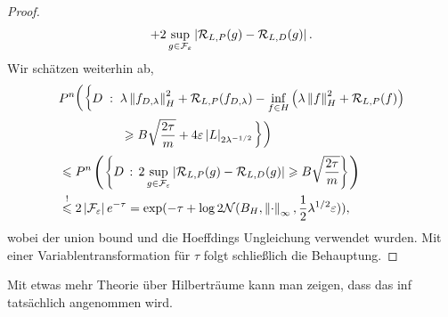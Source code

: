\begin{proof}
\begin{align*}
+ 2\sup_{g\in \mathcal{F}_\varepsilon} \left|\mathcal{R}_{L,P}(g)-\mathcal{R}_{L,D}(g)\right|.
\end{align*}
Wir schätzen weiterhin ab,
\begin{align*}
&P^n\bigg(\bigg\{D\; :\; \lambda\left\|f_{D,\lambda}\right\|^2_H +
\mathcal{R}_{L,P}(f_{D,\lambda}) - \inf_{f\in H} \left( \lambda\left\|f\right\|_H^2 +
\mathcal{R}_{L,P}(f) \right) \\
&\qquad \qquad \quad \geqslant B\sqrt{\frac{2\tau}{m}} + 4\varepsilon
\left|L\right|_{2\lambda^{-1/2}} \bigg\} \bigg)\\
&\leqslant
P^n\left(\left\{ D\,:\,2\sup_{g\in \mathcal{F}_\varepsilon}\left|\mathcal{R}_{L,P}(g) - \mathcal{R}_{L,D}(g)\right|\geqslant
B\sqrt{\frac{2\tau}{m}} \right\} \right)\\
&\overset{!}{\leqslant}
2\left|\mathcal{F}_\varepsilon\right|e^{-\tau}
= \exp(-\tau + \log 2\mathcal{N}(B_H,\left\|\cdot\right\|_\infty, \frac{1}{2}\lambda^{1/2}\varepsilon)
),
\end{align*}
wobei der union bound und die Hoeffdings Ungleichung verwendet wurden. Mit einer
Variablentransformation für $\tau$ folgt schließlich die Behauptung.\qedhere
\end{proof}

\begin{bem*}
Mit etwas mehr Theorie über Hilberträume kann man zeigen, dass das inf
tatsächlich angenommen wird.\maphere
\end{bem*}

